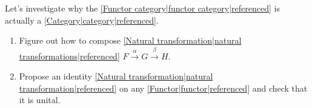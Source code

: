 
Let's investigate why the \ref{Functor category|functor category|referenced} is actually a \ref{Category|category|referenced}.
    \begin{enumerate}
      \item Figure out how to compose \ref{Natural transformation|natural transformations|referenced} $F \xrightarrow{\alpha} G \xrightarrow{\beta}H$.
      \item Propose an identity \ref{Natural transformation|natural transformation|referenced} on any \ref{Functor|functor|referenced} and check that it is unital.
    \end{enumerate}